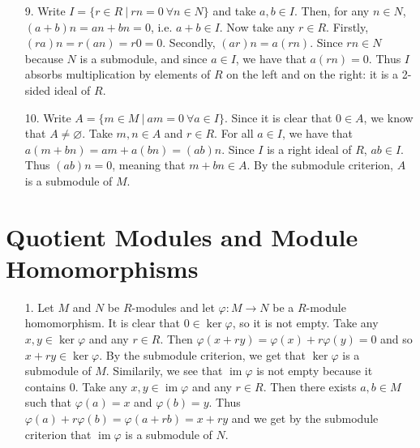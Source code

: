\documentclass{report}
\DeclareMathOperator{\im}{im}
\begin{document}
\begin{enumerate}
\item[9.]
Write $I = \{r\in R\ |\ rn = 0\ \forall n\in N\}$ and take $a,b\in I$. Then, for any $n\in N$, $(a+b)n = an+bn=0$, i.e. $a+b \in I$. Now take any $r\in R$. Firstly, $(ra)n = r(an) = r0 = 0$. Secondly, $(ar)n = a(rn)$. Since $rn \in N$ because $N$ is a submodule, and since $a\in I$, we have that $a(rn)=0$. Thus $I$ absorbs multiplication by elements of $R$ on the left and on the right: it is a 2-sided ideal of $R$.

\item[10.]
Write $A=\{m\in M\ |\ am=0\ \forall a\in I\}$. Since it is clear that $0\in A$, we know that $A\neq\varnothing$. Take $m,n\in A$ and $r \in R$. For all $a\in I$, we have that $a(m+bn) = am+a(bn) = (ab)n$. Since $I$ is a right ideal of $R$, $ab\in I$. Thus $(ab)n=0$, meaning that $m+bn\in A$. By the submodule criterion, $A$ is a submodule of $M$.
\end{enumerate}

\section{Quotient Modules and Module Homomorphisms}

\begin{enumerate}
\item[1.]
Let $M$ and $N$ be $R$-modules and let $\varphi:M\to N$ be a $R$-module homomorphism. It is clear that $0\in\ker\varphi$, so it is not empty. Take any $x,y\in\ker\varphi$ and any $r\in R$. Then $\varphi(x+ry) = \varphi(x)+r\varphi(y)=0$ and so $x+ry\in\ker\varphi$. By the submodule criterion, we get that $\ker\varphi$ is a submodule of $M$.
Similarily, we see that $\im\varphi$ is not empty because it contains $0$. Take any $x,y\in \im\varphi$ and any $r\in R$. Then there exists $a,b\in M$ such that $\varphi(a)=x$ and $\varphi(b)=y$. Thus $\varphi(a)+r\varphi(b) = \varphi(a+rb)=x+ry$ and we get by the submodule criterion that $\im\varphi$ is a submodule of $N$.
\end{enumerate}
\end{document}
